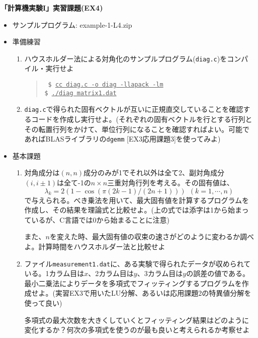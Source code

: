 \documentclass[11pt]{jarticle}
\begin{document}
\noindent
{\bf\large 「計算機実験I」実習課題(EX4)}
\\[-0.5em]

\noindent
\begin{itemize}

\item サンプルプログラム: example-1-L4.zip
  
\item 準備練習
  \begin{enumerate}
  \item ハウスホルダー法による対角化のサンプルプログラム({\tt diag.c})をコンパイル・実行せよ
    \begin{quote} \tt
      \$ \underline{cc diag.c -o diag -llapack -lm} \\
      \$ \underline{./diag matrix1.dat}
    \end{quote}
  \item {\tt diag.c}で得られた固有ベクトルが互いに正規直交していることを確認するコードを作成し実行せよ。(それぞれの固有ベクトルを行とする行列とその転置行列をかけて、単位行列になることを確認すればよい。可能であればBLASライブラリの{\tt dgemm} [EX3応用課題3]を使ってみよ)
  \end{enumerate}

\item 基本課題
  \begin{enumerate}
  \item 対角成分は$(n,n)$成分のみが1でそれ以外は全て2、副対角成分$(i, i \pm 1)$は全て-1の$n \times n$三重対角行列を考える。その固有値は、
    \[ \lambda_k = 2 (1 - \cos (\pi (2 k - 1) / (2 n + 1))) \ \ (k=1,\cdots,n)\]
    で与えられる。べき乗法を用いて、最大固有値を計算するプログラムを作成し、その結果を理論式と比較せよ。(上の式では添字は1から始まっているが、C言語では0から始まることに注意)

    また、$n$を変えた時、最大固有値の収束の速さがどのように変わるか調べよ。計算時間をハウスホルダー法と比較せよ
  \item ファイル{\tt measurement1.dat}に、ある実験で得られたデータが収められている。1カラム目は$x$、2カラム目は$y$、3カラム目は$y$の誤差の値である。最小二乗法によりデータを多項式でフィッティングするプログラムを作成せよ。(実習EX3で用いたLU分解、あるいは応用課題2の特異値分解を使って良い)

    多項式の最大次数を大きくしていくとフィッティング結果はどのように変化するか？何次の多項式を使うのが最も良いと考えられるか考察せよ


\end{enumerate}
\end{itemize}
\end{document}
